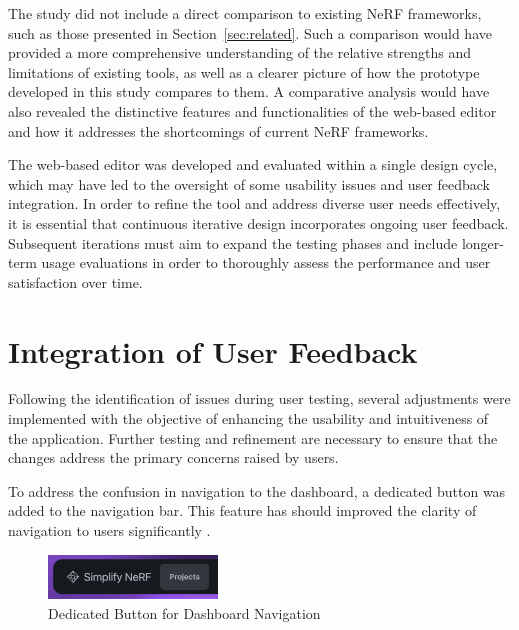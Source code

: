 The study did not include a direct comparison to existing NeRF frameworks, such as those presented in Section~\ref{sec:related}.
Such a comparison would have provided a more comprehensive understanding of the relative strengths and limitations of existing tools, as well as a clearer picture of how the prototype developed in this study compares to them.
A comparative analysis would have also revealed the distinctive features and functionalities of the web-based editor and how it addresses the shortcomings of current NeRF frameworks.

The web-based editor was developed and evaluated within a single design cycle, which may have led to the oversight of some usability issues and user feedback integration.
In order to refine the tool and address diverse user needs effectively, it is essential that continuous iterative design incorporates ongoing user feedback.
Subsequent iterations must aim to expand the testing phases and include longer-term usage evaluations in order to thoroughly assess the performance and user satisfaction over time.

\section{Integration of User Feedback}
\label{sec:discussion:user-feedback}

Following the identification of issues during user testing, several adjustments were implemented with the objective of enhancing the usability and intuitiveness of the application.
Further testing and refinement are necessary to ensure that the changes address the primary concerns raised by users.

To address the confusion in navigation to the dashboard, a dedicated button was added to the navigation bar.
This feature has should improved the clarity of navigation to users significantly .

\begin{figure}[htb]
  \centering
	\includegraphics[width=0.4\textwidth]{figures/fix-1.png}
	\caption{Dedicated Button for Dashboard Navigation}
  \label{fig:fix-1}
\end{figure}

